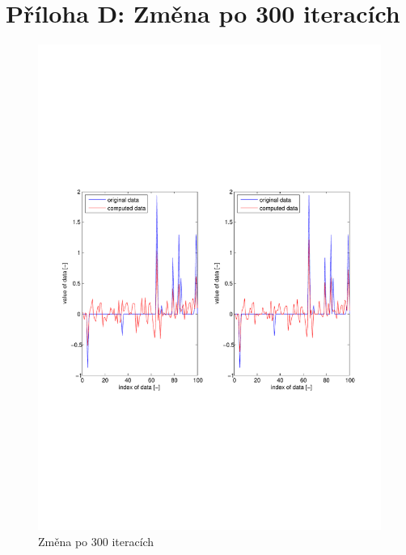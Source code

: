 \documentclass[FM,BP]{tulthesis}
\begin{document}
\section*{Příloha D: Změna po 300 iteracích}
\begin{figure}[!ht]
	\begin{center}
		\includegraphics[scale=0.9]{obr/diff300.pdf}
	\end{center}
	\caption{Změna po 300 iteracích}
	\label{fig:diff300}
\end{figure}  
\end{document}
